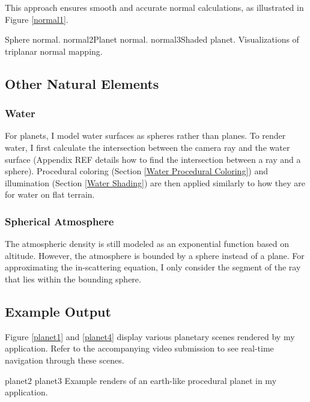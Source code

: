 This approach ensures smooth and accurate normal calculations, as illustrated in Figure \ref{normal1}.

{Sphere normal.}
{normal2}{Planet normal.}
{normal3}{Shaded planet.}
{Visualizations of triplanar normal mapping.}

\subsection{Other Natural Elements}

\subsubsection{Water}

For planets, I model water surfaces as spheres rather than planes. To render water, I first calculate the intersection between the camera ray and the water surface (Appendix REF details how to find the intersection between a ray and a sphere). Procedural coloring (Section \ref{Water Procedural Coloring}) and illumination (Section \ref{Water Shading}) are then applied similarly to how they are for water on flat terrain.

\subsubsection{Spherical Atmosphere}

The atmospheric density is still modeled as an exponential function based on altitude. However, the atmosphere is bounded by a sphere instead of a plane. For approximating the in-scattering equation, I only consider the segment of the ray that lies within the bounding sphere.

\subsection{Example Output}

Figure \ref{planet1} and \ref{planet4} display various planetary scenes rendered by my application. Refer to the accompanying video submission to see real-time navigation through these scenes.

{planet2}{}
{planet3}{}
{Example renders of an earth-like procedural planet in my application.}

\vspace{\baselineskip}
\vspace{\baselineskip}

